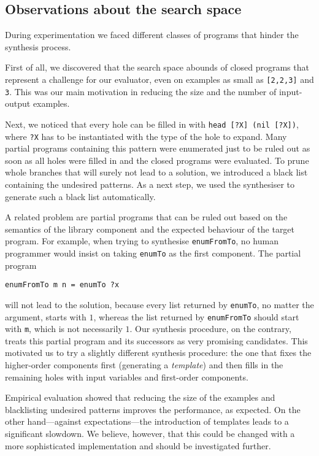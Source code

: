 \subsection{Observations about the search space}\label{observations}
During experimentation we faced different classes of programs that hinder the synthesis process.

First of all, we discovered that the search space abounds of closed programs that represent a challenge for our evaluator, even on examples as small as \lstinline![2,2,3]! and \lstinline!3!. This was our main motivation in reducing the size and the number of input-output examples.

Next, we noticed that every hole can be filled in with \lstinline!head [?X] (nil [?X])!, where \lstinline!?X! has to be instantiated with the type of the hole to expand. Many partial programs containing this pattern were enumerated just to be ruled out as soon as all holes were filled in and the closed programs were evaluated. To prune whole branches that will surely not lead to a solution, we introduced a black list containing the undesired patterns. As a next step, we used the synthesiser to generate such a black list automatically.

A related problem are partial programs that can be ruled out based on the semantics of the library component and the expected behaviour of the target program. For example, when trying to synthesise \lstinline!enumFromTo!, no human programmer would insist on taking \lstinline!enumTo! as the first component. The partial program
\begin{lstlisting}[style=plain]
enumFromTo m n = enumTo ?x
\end{lstlisting}
will not lead to the solution, because every list returned by \lstinline!enumTo!, no matter the argument, starts with $1$, whereas the list returned by \lstinline!enumFromTo! should start with \lstinline!m!, which is not necessarily $1$. Our synthesis procedure, on the contrary, treats this partial program and its successors as very promising candidates.
This motivated us to try a slightly different synthesis procedure: the one that fixes the higher-order components first (generating a \emph{template}) and then fills in the remaining holes with input variables and first-order components.

Empirical evaluation showed that reducing the size of the examples and blacklisting undesired patterns improves the performance, as expected. On the other hand---against expectations---the introduction of templates leads to a significant slowdown. We believe, however, that this could be changed with a more sophisticated implementation and should be investigated further.


